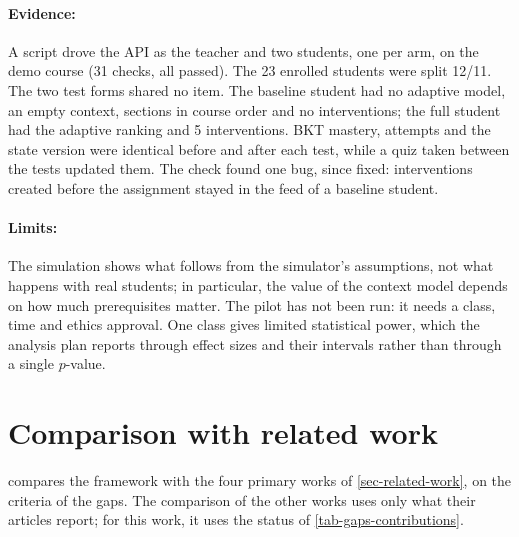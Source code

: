 \paragraph{Evidence:} A script drove the API as the teacher and two
students, one per arm, on the demo course (31 checks, all passed). The
23 enrolled students were split 12/11. The two test forms shared no item.
The baseline student had no adaptive model, an empty context, sections in
course order and no interventions; the full student had the adaptive
ranking and 5 interventions. BKT mastery, attempts and the state version
were identical before and after each test, while a quiz taken between the
tests updated them. The check found one bug, since fixed: interventions
created before the assignment stayed in the feed of a baseline student.

\paragraph{Limits:} The simulation shows what follows from the
simulator's assumptions, not what happens with real students; in
particular, the value of the context model depends on how much
prerequisites matter. The pilot has not been run: it needs a class, time
and ethics approval. One class gives limited statistical power, which the
analysis plan reports through effect sizes and their intervals rather
than through a single $p$-value.

\section{Comparison with related work}
\label{sec-c-compare}

 compares the framework with the four primary
works of \cref{sec-related-work}, on the criteria of the gaps. The
comparison of the other works uses only what their articles report; for
this work, it uses the status of \cref{tab-gaps-contributions}.

